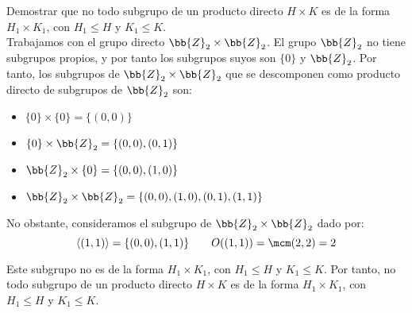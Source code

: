 \begin{ejercicio}
    Demostrar que no todo subgrupo de un producto directo $H\times K$ es de la forma $H_1\times K_1$, con $H_1\leq H$ y $K_1\leq K$.\\

    Trabajamos con el grupo directo $\bb{Z}_2\times \bb{Z}_2$. El grupo $\bb{Z}_2$ no tiene subgrupos propios, y por tanto los subgrupos suyos son $\{0\}$ y $\bb{Z}_2$. Por tanto, los subgrupos de $\bb{Z}_2\times \bb{Z}_2$ que se descomponen como producto directo de subgrupos de $\bb{Z}_2$ son:
    \begin{itemize}
        \item $\{0\}\times \{0\}=\{(0,0)\}$
        \item $\{0\}\times \bb{Z}_2=\{(0,0),(0,1)\}$
        \item $\bb{Z}_2\times \{0\}=\{(0,0),(1,0)\}$
        \item $\bb{Z}_2\times \bb{Z}_2=\{(0,0),(1,0),(0,1),(1,1)\}$
    \end{itemize}

    No obstante, consideramos el subgrupo de $\bb{Z}_2\times \bb{Z}_2$ dado por:
    \begin{equation*}
        \langle (1,1)\rangle = \{(0,0),(1,1)\}\qquad O((1,1))=\mcm(2,2)=2
    \end{equation*}

    Este subgrupo no es de la forma $H_1\times K_1$, con $H_1\leq H$ y $K_1\leq K$. Por tanto, no todo subgrupo de un producto directo $H\times K$ es de la forma $H_1\times K_1$, con $H_1\leq H$ y $K_1\leq K$.
\end{ejercicio}

